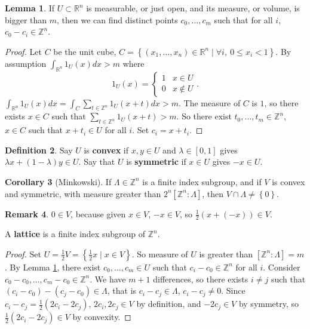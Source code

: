 \documentclass{article}
\newcommand{\Z}{\mathbb{Z}}
\newcommand{\R}{\mathbb{R}}
\newcommand{\rb}[1]{\left( #1 \right)}
\renewcommand{\sb}[1]{\left[ #1 \right]}
\newcommand{\cb}[1]{\left\{ #1 \right\}}
\theoremstyle{definition}\newtheorem{definition}{Definition}[section]
\theoremstyle{definition}\newtheorem{remark}[definition]{Remark}
\theoremstyle{definition}\newtheorem*{example}{Example}
\theoremstyle{definition}\newtheorem*{note}{Note}
\newtheorem{lemma}[definition]{Lemma}
\newtheorem{corollary}[definition]{Corollary}
\begin{document}
\begin{lemma}
\label{lem:4.1}
If $ U \subset \R^n $ is measurable, or just open, and its measure, or volume, is bigger than $ m $, then we can find distinct points $ c_0, \dots, c_m $ such that for all $ i $, $ c_0 - c_i \in \Z^n $.
\end{lemma}

\begin{proof}
Let $ C $ be the unit cube, $ C = \cb{\rb{x_1, \dots, x_n} \in \R^n \mid \forall i, \ 0 \le x_i < 1} $. By assumption $ \int_{\R^n} 1_U\rb{x} dx > m $ where
$$ 1_U\rb{x} = \begin{cases}
1 & x \in U \\
0 & x \notin U
\end{cases}. $$
$ \int_{\R^n} 1_U\rb{x} dx = \int_C \sum_{t \in \Z^n} 1_U\rb{x + t}dx > m $. The measure of $ C $ is $ 1 $, so there exists $ x \in C $ such that $ \sum_{t \in \Z^n} 1_U\rb{x + t} > m $. So there exist $ t_0, \dots, t_m \in \Z^n $, $ x \in C $ such that $ x + t_i \in U $ for all $ i $. Set $ c_i = x + t_i $.
\end{proof}

\begin{definition}
Say $ U $ is \textbf{convex} if $ x, y \in U $ and $ \lambda \in \sb{0, 1} $ gives $ \lambda x + \rb{1 - \lambda}y \in U $. Say that $ U $ is \textbf{symmetric} if $ x \in U $ gives $ -x \in U $.
\end{definition}

\begin{corollary}[Minkowski]
\label{cor:4.3}
If $ \Lambda \in \Z^n $ is a finite index subgroup, and if $ V $ is convex and symmetric, with measure greater than $ 2^n\sb{\Z^n : \Lambda} $, then $ V \cap \Lambda \ne \cb{0} $.
\end{corollary}

\begin{remark}
$ 0 \in V $, because given $ x \in V $, $ -x \in V $, so $ \tfrac{1}{2}\rb{x + \rb{-x}} \in V $.
\end{remark}

A \textbf{lattice} is a finite index subgroup of $ \Z^n $.

\begin{proof}
Set $ U = \tfrac{1}{2}V = \cb{\tfrac{1}{2}x \mid x \in V} $. So measure of $ U $ is greater than $ \sb{\Z^n : \Lambda} = m $. By Lemma \ref{lem:4.1}, there exist $ c_0, \dots, c_m \in U $ such that $ c_i - c_0 \in \Z^n $ for all $ i $. Consider $ c_0 - c_0, \dots, c_m - c_0 \in \Z^n $. We have $ m + 1 $ differences, so there exists $ i \ne j $ such that $ \rb{c_i - c_0} - \rb{c_j - c_0} \in \Lambda $, that is $ c_i - c_j \in \Lambda $, $ c_i - c_j \ne 0 $. Since $ c_i - c_j = \tfrac{1}{2}\rb{2c_i - 2c_j} $, $ 2c_i, 2c_j \in V $ by definition, and $ -2c_j \in V $ by symmetry, so $ \tfrac{1}{2}\rb{2c_i - 2c_j} \in V $ by convexity.
\end{proof}
\end{document}

